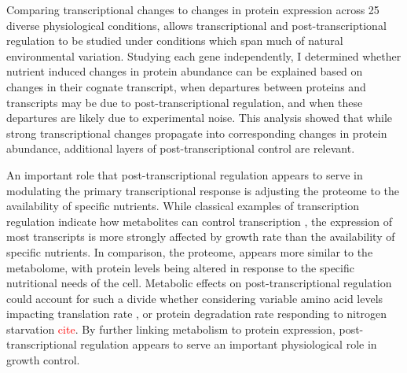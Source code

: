Comparing transcriptional changes to changes in protein expression across 25 diverse physiological conditions, allows transcriptional and post-transcriptional regulation to be studied under conditions which span much of natural environmental variation.  Studying each gene independently, I determined whether nutrient induced changes in protein abundance can be explained based on changes in their cognate transcript, when departures between proteins and transcripts may be due to post-transcriptional regulation, and when these departures are likely due to experimental noise. This analysis showed that while strong transcriptional changes propagate into corresponding changes in protein abundance, additional layers of post-transcriptional control are relevant.

An important role that post-transcriptional regulation appears to serve in modulating the primary transcriptional response is adjusting the proteome to the availability of specific nutrients. While classical examples of transcription regulation indicate how metabolites can control transcription \cite{Jacob:1961du, Jones:1982dn}, the expression of most transcripts is more strongly affected by growth rate than the availability of specific nutrients.  In comparison, the proteome, appears more similar to the metabolome, with protein levels being altered in response to the specific nutritional needs of the cell. Metabolic effects on post-transcriptional regulation could account for such a divide whether considering variable amino acid levels impacting translation rate \cite{Klumpp:2009ic}, or protein degradation rate responding to nitrogen starvation \textcolor{red}{cite}. By further linking metabolism to protein expression, post-transcriptional regulation appears to serve an important physiological role in growth control.


